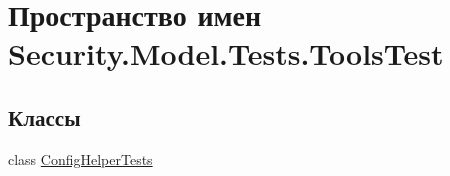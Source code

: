 \hypertarget{namespace_security_1_1_model_1_1_tests_1_1_tools_test}{}\section{Пространство имен Security.\+Model.\+Tests.\+Tools\+Test}
\label{namespace_security_1_1_model_1_1_tests_1_1_tools_test}
\subsection*{Классы}
\begin{DoxyCompactItemize}
\item 
class \hyperlink{class_security_1_1_model_1_1_tests_1_1_tools_test_1_1_config_helper_tests}{Config\+Helper\+Tests}
\end{DoxyCompactItemize}
